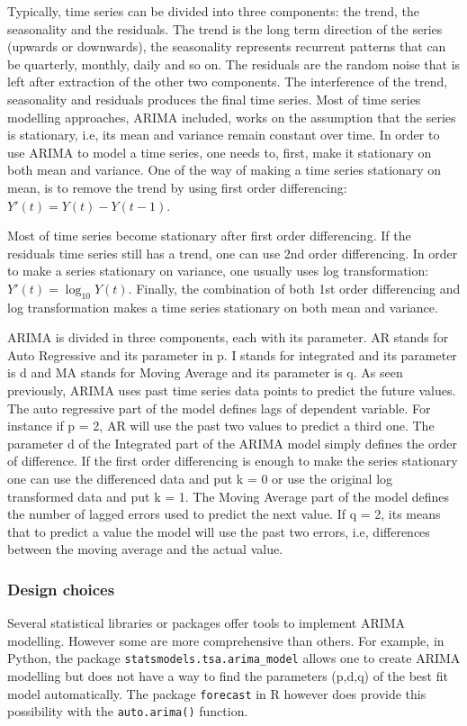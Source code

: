 \documentclass{article} %
\begin{document}
Typically, time series can be divided into three components: the trend, the seasonality and the residuals. The trend is the long term direction of the series (upwards or downwards), the seasonality represents recurrent patterns that can be quarterly, monthly, daily and so on. The residuals are the random noise that is left after extraction of the other two components. The interference of the trend, seasonality and residuals produces the final time series.
Most of time series modelling approaches, ARIMA included, works on the assumption that the series is stationary, i.e, its mean and variance remain constant over time. In order to use ARIMA to model a time series, one needs to, first, make it stationary on both mean and variance.
One of the way of making a time series stationary on mean, is to remove the trend by using first order differencing: $Y'(t) = Y(t)-Y(t-1)$.

Most of time series become stationary after first order differencing. If the residuals time series still has a trend, one can use 2nd order differencing.
In order to make a series stationary on variance, one usually uses log transformation: $Y'(t) = \log_{10}Y(t)$.
Finally, the combination of both 1st order differencing and log transformation makes a time series stationary on both mean and variance.

ARIMA is divided in three components, each with its parameter. AR stands for Auto Regressive and its parameter in p. I stands for integrated and its parameter is d and MA stands for Moving Average and its parameter is q.
As seen previously, ARIMA uses past time series data points to predict the future values. The auto regressive part of the model defines lags of dependent variable. For instance if p = 2, AR will use the past two values to predict a third one.
The parameter d of the Integrated part of the ARIMA model simply defines the order of difference. If the first order differencing is enough to make the series stationary one can use the differenced data and put k = 0 or use the original log transformed data and put k = 1.
The Moving Average part of the model defines the number of lagged errors used to predict the next value. If q = 2, its means that to predict a value the model will use the past two errors, i.e, differences between the moving average and the actual value.

\subsubsection*{Design choices}
Several statistical libraries or packages offer tools to implement ARIMA modelling. However some are more comprehensive than others. For example, in Python, the package \verb~statsmodels.tsa.arima_model~ allows one to create ARIMA modelling but does not have a way to find the parameters (p,d,q) of the best fit model automatically. The package \verb~forecast~ in R however does provide this possibility with the \verb~auto.arima()~ function.
\end{document}
